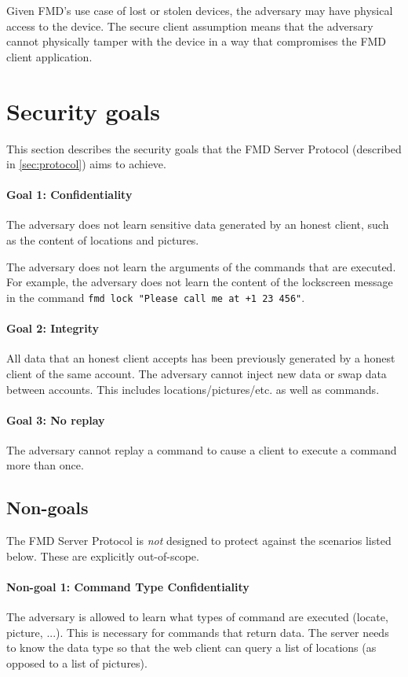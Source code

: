 \documentclass[11pt,a4paper]{article}
\begin{document}
Given FMD's use case of lost or stolen devices,
the adversary may have physical access to the device.
The secure client assumption means that the adversary cannot physically tamper
with the device in a way that compromises the FMD client application.


\newpage

\section{Security goals}

This section describes the security goals that the FMD Server Protocol (described
in \autoref{sec:protocol}) aims to achieve.

\paragraph{Goal 1: Confidentiality}
The adversary does not learn sensitive data generated by an honest client,
such as the content of locations and pictures.

The adversary does not learn the arguments of the commands that are executed.
For example, the adversary does not learn the content of the lockscreen message
in the command \texttt{fmd lock "Please call me at +1 23 456"}.

\paragraph{Goal 2: Integrity}
All data that an honest client accepts has been previously generated by a honest client of the same account.
The adversary cannot inject new data or swap data between accounts.
This includes locations/pictures/etc. as well as commands.

\paragraph{Goal 3: No replay}
The adversary cannot replay a command to cause a client to execute a command more than once.


\subsection{Non-goals}\label{sec:non-goals}

The FMD Server Protocol is \emph{not} designed to protect against the scenarios listed below.
These are explicitly out-of-scope.

\paragraph{Non-goal 1: Command Type Confidentiality}
The adversary is allowed to learn what types of command are executed (locate, picture, ...).
This is necessary for commands that return data.
The server needs to know the data type so that the web client can query a list of locations
(as opposed to a list of pictures).
\end{document}
